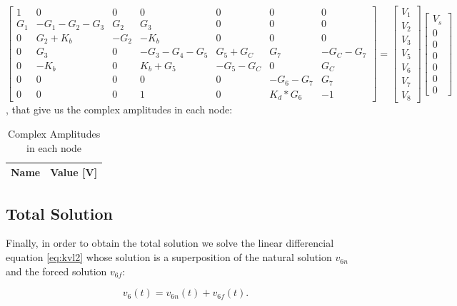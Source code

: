 $$
\begin{bmatrix}
  1 & 0 & 0 & 0 & 0 & 0 & 0 \\
  G_{1} & -G_{1}-G_{2}-G_{3} & G_{2} & G_{3} & 0 & 0 & 0 \\
  0 & G_{2}+K_{b} & -G_{2} & -K_{b} & 0 & 0 & 0 \\
  0 & G_{3} & 0 & -G_{3}-G_{4}-G_{5} & G_{5}+G_{C} & G_{7} & -G_{C} -G_{7} \\
  0 & -K_{b} & 0 & K_{b}+G_{5} & -G_{5}-G_{C} & 0 & G_{C} \\
  0 & 0 & 0 & 0 & 0 & -G_{6}-G_{7} & G_{7} \\
  0 & 0 & 0 & 1 & 0 & K_{d}*G_{6} & -1
\end{bmatrix}
=
\begin{bmatrix}
  V_{1}\\
  V_{2}\\
  V_{3}\\
  V_{5}\\
  V_{6}\\
  V_{7}\\
  V_{8}
\end{bmatrix}
\begin{bmatrix}
  V_{s}\\
  0\\
  0\\
  0\\
  0\\
  0\\
  0
\end{bmatrix}
$$,
that give us the complex amplitudes in each node:

\begin{table} [H]
  \centering
  \begin{tabular}{|l|r|}
    \hline    
    {\bf Name} & {\bf Value [V]} \\ \hline
    
  \end{tabular}
  \caption{Complex Amplitudes in each node}
  \label{tab:volt3}
\end{table}



\subsection{Total Solution}
\label{subsec:total solution}

Finally, in order to obtain the total solution we solve the linear differencial equation \ref{eq:kvl2} whose solution is a superposition of the natural solution $v_{6n}$ and the forced solution $v_{6f}$:

\begin{equation}
  v_6(t) = v_{6n}(t) + v_{6f}(t).
  \label{eq:v6_sol}
\end{equation}




